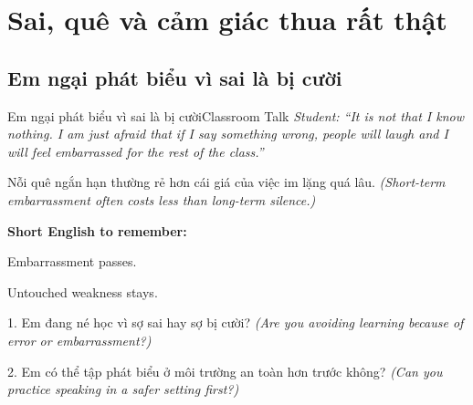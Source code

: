 \chapter{Sai, quê và cảm giác thua rất thật}

\section{Em ngại phát biểu vì sai là bị cười}
\begin{truyen}{Em ngại phát biểu vì sai là bị cười}{Classroom Talk}
\textit{Student: ``It is not that I know nothing. I am just afraid that if I say something wrong, people will laugh and I will feel embarrassed for the rest of the class.''}\\[4pt]



\end{truyen}

\begin{baihoc}
Nỗi quê ngắn hạn thường rẻ hơn cái giá của việc im lặng quá lâu.
\textit{(Short-term embarrassment often costs less than long-term silence.)}
\end{baihoc}

\begin{ghinhoanh}
\textbf{Short English to remember:}

Embarrassment passes.

Untouched weakness stays.
\end{ghinhoanh}

\begin{tuhocnhanh}
1. Em đang né học vì sợ sai hay sợ bị cười? \textit{(Are you avoiding learning because of error or embarrassment?)}

2. Em có thể tập phát biểu ở môi trường an toàn hơn trước không? \textit{(Can you practice speaking in a safer setting first?)}
\end{tuhocnhanh}
\ngancach

